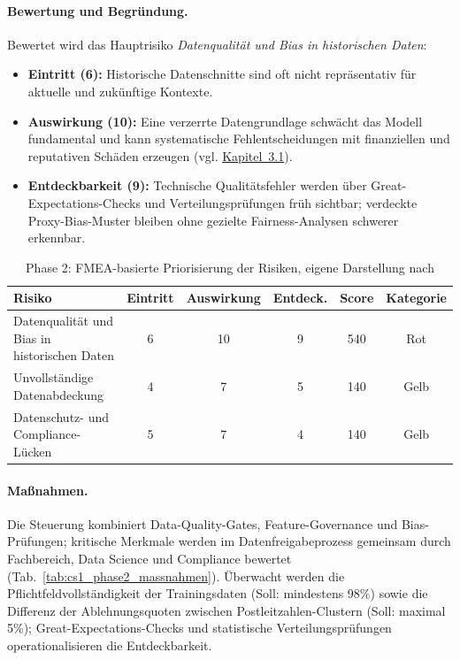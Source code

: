 \paragraph*{Bewertung und Begründung.}
Bewertet wird das Hauptrisiko \textit{Datenqualität und Bias in historischen Daten}:
\begin{itemize}
  \item \textbf{Eintritt (6):} Historische Datenschnitte sind oft nicht repräsentativ für aktuelle und zukünftige Kontexte.
  \item \textbf{Auswirkung (10):} Eine verzerrte Datengrundlage schwächt das Modell fundamental und kann systematische Fehlentscheidungen mit finanziellen und reputativen Schäden erzeugen (vgl. \hyperref[sec:methode1]{Kapitel~3.1}).
  \item \textbf{Entdeckbarkeit (9):} Technische Qualitätsfehler werden über Great-Expectations-Checks und Verteilungsprüfungen früh sichtbar; verdeckte Proxy-Bias-Muster bleiben ohne gezielte Fairness-Analysen schwerer erkennbar.
\end{itemize}

\begin{table}[!htbp]
\centering
\begin{tabular}{|p{5.5cm}|c|c|c|c|c|}
\hline
\textbf{Risiko} & \textbf{Eintritt} & \textbf{Auswirkung} & \textbf{Entdeck.} & \textbf{Score} & \textbf{Kategorie} \\
\hline
Datenqualität und Bias in historischen Daten & 6 & 10 & 9 & 540 & Rot \\
Unvollständige Datenabdeckung & 4 & 7 & 5 & 140 & Gelb \\
Datenschutz- und Compliance-Lücken & 5 & 7 & 4 & 140 & Gelb \\
\hline
\end{tabular}
\caption{Phase 2: FMEA-basierte Priorisierung der Risiken, eigene Darstellung nach \cite{Bundesministerium_2018}}
\label{tab:cs1_phase2_risiken}
\end{table}

\paragraph*{Maßnahmen.}
Die Steuerung kombiniert Data-Quality-Gates, Feature-Governance und Bias-Prüfungen;
kritische Merkmale werden im Datenfreigabeprozess gemeinsam durch Fachbereich,
Data Science und Compliance bewertet (Tab.~\ref{tab:cs1_phase2_massnahmen}).
Überwacht werden die Pflichtfeldvollständigkeit der Trainingsdaten (Soll: mindestens 98\%) sowie die Differenz der Ablehnungsquoten zwischen Postleitzahlen-Clustern (Soll: maximal 5\%); Great-Expectations-Checks und statistische Verteilungsprüfungen operationalisieren die Entdeckbarkeit.

